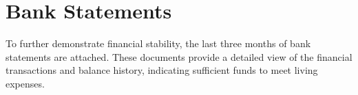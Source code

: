 \documentclass{article}
\begin{document}
\section{Bank Statements}
To further demonstrate financial stability, the last three months of bank statements are attached. These documents provide a detailed view of the financial transactions and balance history, indicating sufficient funds to meet living expenses.




\end{document}
